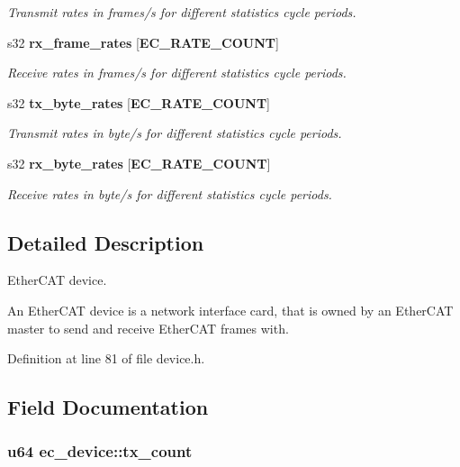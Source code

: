 \begin{DoxyCompactItemize}
\begin{DoxyCompactList}\small\item\em Transmit rates in frames/s for different statistics cycle periods. \end{DoxyCompactList}\item 
s32 {\bf rx\-\_\-frame\-\_\-rates} [{\bf E\-C\-\_\-\-R\-A\-T\-E\-\_\-\-C\-O\-U\-N\-T}]\label{structec__device_a8e78783b1d22fd12b5d2abe263184bb1}

\begin{DoxyCompactList}\small\item\em Receive rates in frames/s for different statistics cycle periods. \end{DoxyCompactList}\item 
s32 {\bf tx\-\_\-byte\-\_\-rates} [{\bf E\-C\-\_\-\-R\-A\-T\-E\-\_\-\-C\-O\-U\-N\-T}]
\begin{DoxyCompactList}\small\item\em Transmit rates in byte/s for different statistics cycle periods. \end{DoxyCompactList}\item 
s32 {\bf rx\-\_\-byte\-\_\-rates} [{\bf E\-C\-\_\-\-R\-A\-T\-E\-\_\-\-C\-O\-U\-N\-T}]
\begin{DoxyCompactList}\small\item\em Receive rates in byte/s for different statistics cycle periods. \end{DoxyCompactList}\end{DoxyCompactItemize}


\subsection{Detailed Description}
Ether\-C\-A\-T device. 

An Ether\-C\-A\-T device is a network interface card, that is owned by an Ether\-C\-A\-T master to send and receive Ether\-C\-A\-T frames with. 

Definition at line 81 of file device.\-h.



\subsection{Field Documentation}
\subsubsection[{tx\-\_\-count}]{\setlength{\rightskip}{0pt plus 5cm}u64 ec\-\_\-device\-::tx\-\_\-count}\label{structec__device_a0cdf625147761dedcd8aa0ee08434949}



